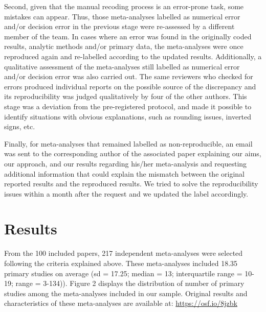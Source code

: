\documentclass[
  ,jou, a4paper,floatsintext]{apa6}
\begin{document}
Second, given that the manual recoding process is an error-prone task, some mistakes can appear. Thus, those meta-analyses labelled as numerical error and/or decision error in the previous stage were re-assessed by a different member of the team. In cases where an error was found in the originally coded results, analytic methods and/or primary data, the meta-analyses were once reproduced again and re-labelled according to the updated results. Additionally, a qualitative assessment of the meta-analyses still labelled as numerical error and/or decision error was also carried out. The same reviewers who checked for errors produced individual reports on the possible source of the discrepancy and its reproducibility was judged qualitatively by four of the other authors. This stage was a deviation from the pre-registered protocol, and made it possible to identify situations with obvious explanations, such as rounding issues, inverted signs, etc.

Finally, for meta-analyses that remained labelled as non-reproducible, an email was sent to the corresponding author of the associated paper explaining our aims, our approach, and our results regarding his/her meta-analysis and requesting additional information that could explain the mismatch between the original reported results and the reproduced results. We tried to solve the reproducibility issues within a month after the request and we updated the label accordingly.

\hypertarget{results}{%
\section{Results}\label{results}}

From the 100 included papers, 217 independent meta-analyses were selected following the criteria explained above. These meta-analyses included 18.35 primary studies on average (sd = 17.25; median = 13; interquartile range = 10-19; range = 3-134)). Figure 2 displays the distribution of number of primary studies among the meta-analyses included in our sample. Original results and characteristics of these meta-analyses are available at: \url{https://osf.io/8jzbk}
\end{document}
